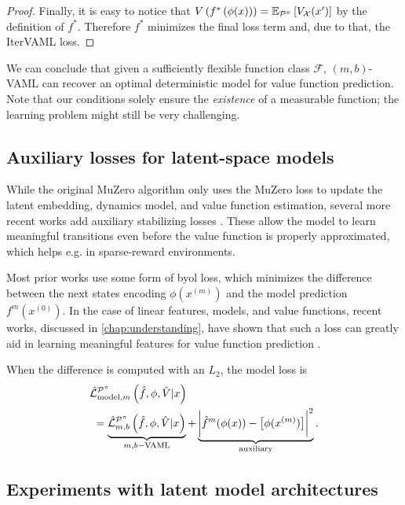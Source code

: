 \begin{proof}
Finally, it is easy to notice that $V\roundb{f^*\roundb{\phi(x)}} = \EEX{\P^\pi}{V_\mathcal{X}(x')}$ by the definition of $f^*$.
Therefore $f^*$ minimizes the final loss term and, due to that, the IterVAML loss.

\end{proof}



We can conclude that given a sufficiently flexible function class $\mathcal{F}$, $(m,b)$-VAML can recover an optimal deterministic model for value function prediction.
Note that our conditions solely ensure the \emph{existence} of a measurable function; the learning problem might still be very challenging.

\subsection{Auxiliary losses for latent-space models}

While the original MuZero algorithm only uses the MuZero loss to update the latent embedding, dynamics model, and value function estimation, several more recent works add auxiliary stabilizing losses \parencite{ye2021mastering,hafner2021mastering,hansen2024tdmpc,voelcker2025mad}.
These allow the model to learn meaningful transitions even before the value function is properly approximated, which helps e.g. in sparse-reward environments.

Most prior works use some form of \ac{byol} \parencite{grill2020bootstrap} loss, which minimizes the difference between the next states encoding $\phi(x^{(m)})$ and the model prediction $f^m(x^{(0)})$.
In the case of linear features, models, and value functions, recent works, discussed in \autoref{chap:understanding}, have shown that such a loss can greatly aid in learning meaningful features for value function prediction \parencite{lyle2022understanding,tang2022understanding,ni2024bridging,voelcker2024when}.

When the difference is computed with an $L_2$, the model loss is
\begin{align}
    & \hat{\mathcal{L}}^{\P^\pi}_{\mathrm{model}, m}\left(\hat{f},
\phi, \hat{V}|x\right) \nonumber\\
    & ~ = \underbrace{\hat{\mathcal{L}}^{\P^\pi}_{m,b}\left(\hat{f},\phi, \hat{V}|x\right)}_{m,b\mathrm{-VAML}} + \underbrace{\biggl| \hat{f}^m(\phi(x)) - \bigl[\phi(x^{(m)}) \bigr] \biggr|^2}_\mathrm{auxiliary}.
\end{align}


\subsection{Experiments with latent model architectures}
\label{sec:cvaml:latent_experiments}

